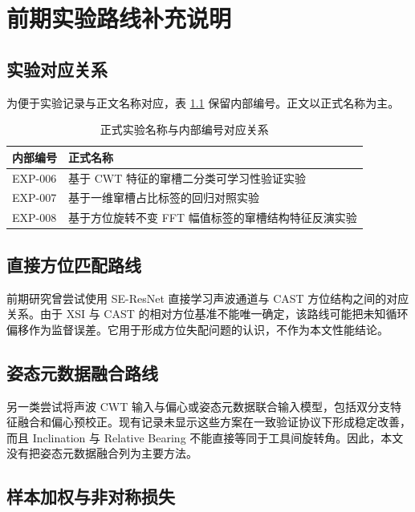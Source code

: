 \chapter{前期实验路线补充说明}

\section{实验对应关系}

为便于实验记录与正文名称对应，表 \ref{tab:appendix-exp-map} 保留内部编号。正文以正式名称为主。

\begin{table}[htbp]
  \centering
  \caption{正式实验名称与内部编号对应关系}
  \label{tab:appendix-exp-map}
  \begin{tabular}{lp{}}
    \toprule
    内部编号 & 正式名称 \\
    \midrule
    EXP-006 & 基于 CWT 特征的窜槽二分类可学习性验证实验 \\
    EXP-007 & 基于一维窜槽占比标签的回归对照实验 \\
    EXP-008 & 基于方位旋转不变 FFT 幅值标签的窜槽结构特征反演实验 \\
    \bottomrule
  \end{tabular}
\end{table}

\section{直接方位匹配路线}

前期研究曾尝试使用 SE-ResNet 直接学习声波通道与 CAST 方位结构之间的对应关系。由于 XSI 与 CAST 的相对方位基准不能唯一确定，该路线可能把未知循环偏移作为监督误差。它用于形成方位失配问题的认识，不作为本文性能结论。

\section{姿态元数据融合路线}

另一类尝试将声波 CWT 输入与偏心或姿态元数据联合输入模型，包括双分支特征融合和偏心预校正。现有记录未显示这些方案在一致验证协议下形成稳定改善，而且 Inclination 与 Relative Bearing 不能直接等同于工具间旋转角。因此，本文没有把姿态元数据融合列为主要方法。

\section{样本加权与非对称损失}


